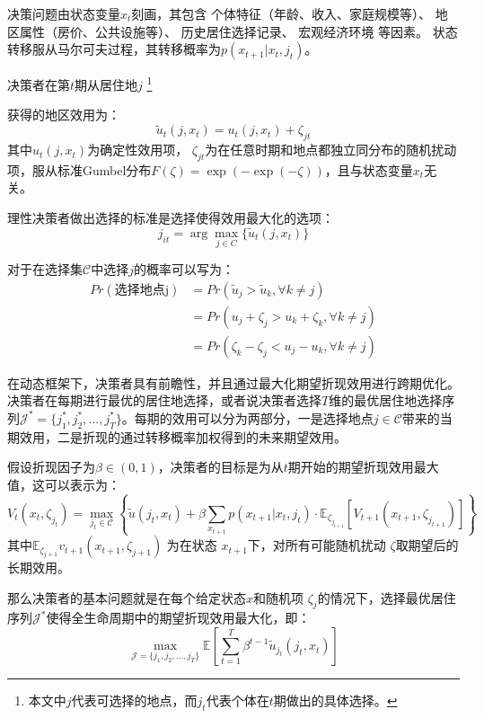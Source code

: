 \documentclass[a4paper, zihao=-4, fontset = mac, oneside]{ctexbook} %
\let\oldfootnote\footnote
\renewcommand{\footnote}[1]{%
  \oldfootnote{\setstretch{1.5}#1}%
}
\begin{document}
决策问题由状态变量$x_t$刻画，其包含
个体特征（年龄、收入、家庭规模等）、
地区属性（房价、公共设施等）、
历史居住选择记录、
宏观经济环境
等因素。
状态转移服从马尔可夫过程，其转移概率为$p(x_{t+1}|x_t,j_t)$。

决策者在第$t$期从居住地$j$
\footnote{本文中$j$代表可选择的地点，而$j_t$代表个体在$t$期做出的具体选择。}
获得的地区效用为：
\begin{equation}
  \tilde{u}_t(j, x_t) = u_t(j, x_t)  +  \zeta_{jt}
  \label{eq:地区效用函数}
\end{equation}
其中$u_t(j, x_t)$为确定性效用项，
$\zeta_{jt}$为在任意时期和地点都独立同分布的随机扰动项，服从标准Gumbel分布$F(\zeta) = \exp(-\exp(-\zeta))$，且与状态变量$x_t$无关。


理性决策者做出选择的标准是选择使得效用最大化的选项：
\begin{equation}
  j_{it} = \arg\max_{j \in C} \{\tilde{u}_t(j, x_t)\}
\end{equation}

对于在选择集$\mathcal{C}$中选择$j$的概率可以写为：
\begin{equation}
\begin{split}
  Pr(\text{选择地点j})&=Pr(\tilde u_j > \tilde u_k, \forall k \neq j)
  \\&=Pr(u_j+\zeta_j>u_k+\zeta_k, \forall k \neq j)
  \\&=Pr(\zeta_k-\zeta_j<u_j-u_k, \forall k \neq j)
\end{split}
\label{eq:C中地点选择j的概率}
\end{equation}

在动态框架下，决策者具有前瞻性，并且通过最大化期望折现效用进行跨期优化。决策者在每期进行最优的居住地选择，或者说决策者选择$T$维的最优居住地选择序列$\mathcal{J}^*=\{j_1^*,j_2^*,\ldots,j_T^*\}$。每期的效用可以分为两部分，一是选择地点$j \in \mathcal{C}$带来的当期效用，二是折现的通过转移概率加权得到的未来期望效用。

假设折现因子为$\beta \in (0,1)$，决策者的目标是为从$t$期开始的期望折现效用最大值，这可以表示为：
\begin{equation}
  V_t(x_t, \zeta_{j_t}) = \max_{j_t \in \mathcal{C}} 
  \left\{ 
  \tilde{u}(j_t, x_t) + \beta \sum_{x_{t+1}} p(x_{t+1} | x_t, j_t) \cdot \mathbb{E}_{\zeta_{j_{t+1}}} [ V_{t+1}(x_{t+1}, \zeta_{j_{t+1}}) ]
  \right\}
\end{equation}
其中$\mathbb{E}_{\zeta_{j+1}} v_{t+1}(x_{t+1},\zeta_{j+1})$
为在状态 
$x_{t+1}$下，对所有可能随机扰动 
$\zeta$取期望后的长期效用。

那么决策者的基本问题就是在每个给定状态$x$和随机项 $\zeta_j$的情况下，选择最优居住序列$\mathcal{J}^*$使得全生命周期中的期望折现效用最大化，即：
\begin{equation}
  \max_{\mathcal{J}=\{j_1,j_2,\ldots,j_T\}} \mathbb{E} [ \sum_{t=1}^{T} \beta^{t-1} \tilde{u}_{j_t}(j_t,x_t) ]
\end{equation}
\end{document}

